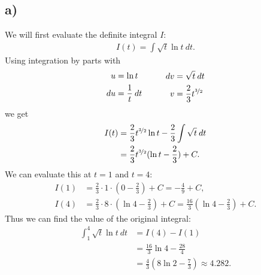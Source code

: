 \documentclass{article}
\begin{document}
\subsection*{a)}
We will first evaluate the definite integral $I$:
\begin{align*}
  I(t)=\int \sqrt{t}\ln t\: dt.
\end{align*}
Using integration by parts with
\begin{align*}
  \begin{aligned}
    u  & = \ln t           \\
    du & = \frac{1}{t}\:dt
  \end{aligned}
  \hspace{1cm}
  \begin{aligned}
    dv & = \sqrt{t}\:dt                   \\
    v  & = \frac{2}{3}t^{\nicefrac{3}{2}}
  \end{aligned}
\end{align*}
we get
\begin{align*}
  I(t) & =\frac{2}{3}t^{\nicefrac{3}{2}}\ln t - \frac{2}{3}\int \sqrt{t}\:dt \\
       & =\frac{2}{3}t^{\nicefrac{3}{2}}(\ln t - \frac{2}{3}) + C.
\end{align*}
We can evaluate this at $t=1$ and $t=4$:
\begin{align*}
  I(1) & =\frac{2}{3}\cdot 1\cdot (0-\frac{2}{3})+C=-\frac{4}{9}+C,                           \\
  I(4) & =\frac{2}{3}\cdot 8\cdot(\ln 4 - \frac{2}{3})+C=\frac{16}{3}(\ln 4 - \frac{2}{3})+C.
\end{align*}
Thus we can find the value of the original integral:
\begin{align*}
  \int_1^4 \sqrt{t}\ln t\:dt & = I(4)-I(1)                                       \\
                             & =\frac{16}{3}\ln 4 - \frac{28}{4}                 \\
                             & = \frac{4}{3}(8\ln 2 - \frac{7}{3})\approx 4.282.
\end{align*}
\end{document}
